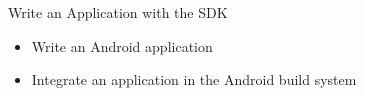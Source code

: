 \setuplabframe
{Write an Application with the SDK}
{
  \begin{itemize}
  \item Write an Android application
  \item Integrate an application in the Android build system
  \end{itemize}
}